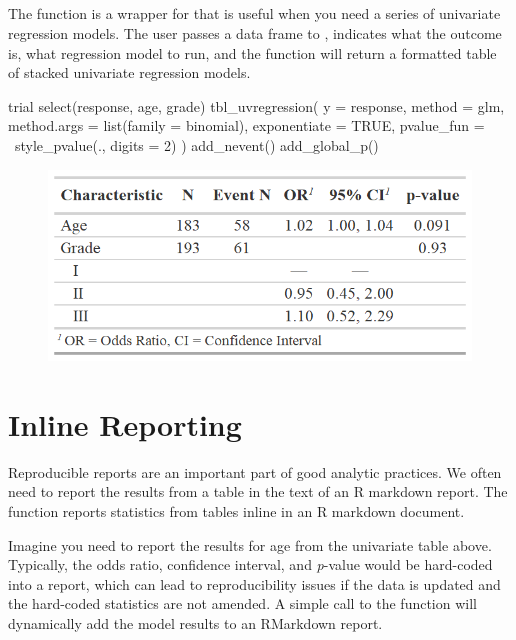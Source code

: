 \subsection{\texorpdfstring{}{tbl\_uvregression()}}

The  function is a wrapper for  that is useful when you need a series of univariate regression models.
The user passes a data frame to , indicates what the outcome is, what regression model to run, and the function will return a formatted table of stacked univariate regression models.

\begin{example}
trial %
  select(response, age, grade) %
  tbl_uvregression(
    y = response,
    method = glm,
    method.args = list(family = binomial),
    exponentiate = TRUE,
    pvalue_fun = ~style_pvalue(., digits = 2)
  ) %
  add_nevent() %
  add_global_p()
\end{example}
\newpage
\begin{figure}[h!]
  \includegraphics[scale=0.73]{uvregression.png}
  \centering
\end{figure}

\section{Inline Reporting}

Reproducible reports are an important part of good analytic practices.
We often need to report the results from a table in the text of an R markdown report.
The   function reports statistics from  tables inline in an R markdown document.

Imagine you need to report the results for age from the univariate table above.
Typically, the odds ratio, confidence interval, and \emph{p}-value would be hard-coded into a report, which can lead to reproducibility issues if the data is updated and the hard-coded statistics are not amended.
A simple call to the  function will dynamically add the model results to an RMarkdown report.

